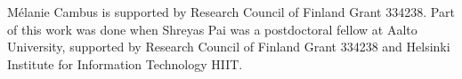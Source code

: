 \documentclass{theoretics}
\begin{document}
M\'elanie Cambus is supported by Research Council of Finland Grant 334238. Part of this work was done when Shreyas Pai was a postdoctoral fellow at Aalto University, supported by Research Council of Finland Grant 334238 and Helsinki Institute for Information Technology HIIT.






\printbibliography
 

\end{document}
